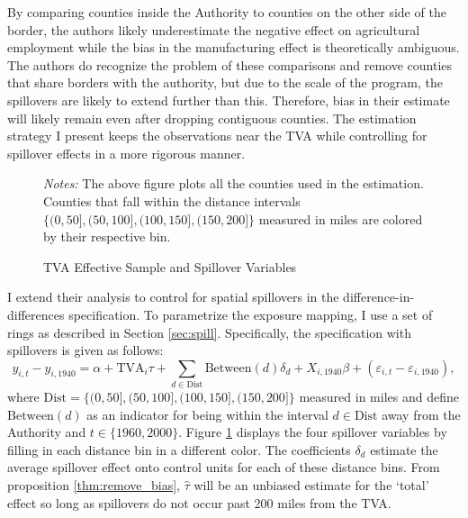 \documentclass[11pt]{article}
\begin{document}
By comparing counties inside the Authority to counties on the other side of the border, the authors likely underestimate the negative effect on agricultural employment while the bias in the manufacturing effect is theoretically ambiguous. The authors do recognize the problem of these comparisons and remove counties that share borders with the authority, but due to the scale of the program, the spillovers are likely to extend further than this. Therefore, bias in their estimate will likely remain even after dropping contiguous counties. The estimation strategy I present keeps the observations near the TVA while controlling for spillover effects in a more rigorous manner.  

\begin{figure}[tb!]
    \caption{TVA Effective Sample and Spillover Variables}
    \label{fig:tva_sample}

    {\centering
    }
    {\footnotesize \textit{Notes:} The above figure plots all the counties used in the estimation. Counties that fall within the distance intervals $\{ (0, 50], (50, 100], (100, 150], (150, 200] \}$ measured in miles are colored by their respective bin.} 
\end{figure}

I extend their analysis to control for spatial spillovers in the difference-in-differences specification. To parametrize the exposure mapping, I use a set of rings as described in Section \ref{sec:spill}. Specifically, 
the specification with spillovers is given as follows:  
\begin{equation}\label{eq:tva_spillover}
    y_{i, t} - y_{i, 1940} = \alpha + \text{TVA}_i \tau + \sum_{d \in \text{Dist}} \text{Between}(d)\delta_d + X_{i, 1940} \beta + (\varepsilon_{i, t} - \varepsilon_{i, 1940}),
\end{equation} 
where $\text{Dist} = \{(0, 50], (50, 100], (100, 150], (150, 200]\}$ measured in miles and define $\text{Between}(d)$ as an indicator for being within the interval $d \in \text{Dist}$ away from the Authority and $t \in \{1960, 2000\}$. Figure \ref{fig:tva_sample} displays the four spillover variables by filling in each distance bin in a different color. The coefficients $\delta_d$ estimate the average spillover effect onto control units for each of these distance bins. From proposition \ref{thm:remove_bias}, $\hat{\tau}$ will be an unbiased estimate for the `total' effect so long as spillovers do not occur past 200 miles from the TVA.
\end{document}
